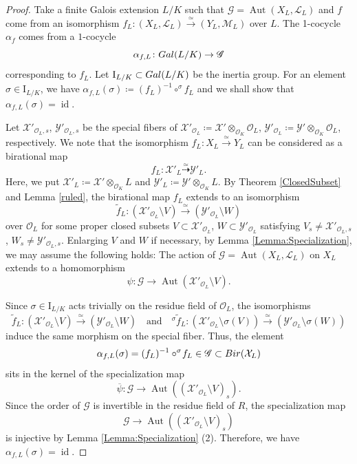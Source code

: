 \documentclass[11pt,reqno,oneside]{amsart}
\numberwithin{equation}{section}
\theoremstyle{definition}
\DeclareMathOperator{\Aut}{Aut}
\DeclareMathOperator{\id}{id}
\newcommand{\Gal}{{\rm Gal}}
\newcommand{\Bir}{{\rm Bir}}
\newcommand\rI{\mathrm{I}}
\begin{document}
\begin{proof}
Take a finite Galois extension $L/K$ such that
$\mathscr{G} = \Aut(X_{L}, \mathscr{L}_{L})$ and 
$f$ come from an isomorphism
$f_L \colon (X_L, \mathscr{L}_{L})
\overset{\simeq}{\to}
(Y_L, \mathscr{M}_{L})$ over $L$.
The 1-cocycle  $\alpha_f$ comes from a $1$-cocycle
$$\alpha_{f,L} \colon \Gal(L/K) \to \mathscr{G}$$
corresponding to $f_L$.
Let $\rI_{L/K} \subset \Gal(L/K)$ be the inertia group.
For an element $\sigma \in \rI_{L/K}$, we have
$\alpha_{f,L}(\sigma) \coloneqq (f_L)^{-1} \circ ^{\sigma} \!f_L$ 
and 
we shall show that $\alpha_{f,L}(\sigma) = \id$.

Let $\mathcal{X}'_{\mathscr{O}_L,s}$, $\mathcal{Y}'_{\mathscr{O}_L,s}$
be the special fibers of
$\mathcal{X}'_{\mathscr{O}_L} \coloneqq \mathcal{X}' \otimes_{\mathscr{O}_K} \mathscr{O}_L$,
$\mathcal{Y}'_{\mathscr{O}_L} \coloneqq \mathcal{Y}' \otimes_{\mathscr{O}_K} \mathscr{O}_L$,
respectively.
We note that the isomorphism $f_L \colon X_L \overset{\simeq}{\to} Y_L$
can be considered as a birational map
\[f_L \colon \mathcal{X}'_{L} \overset{\simeq}{\dashrightarrow} \mathcal{Y}'_{L}.\]
Here, we put $\mathcal{X}'_{L} \coloneqq \mathcal{X}' \otimes_{\mathscr{O}_K} L$ and
$\mathcal{Y}'_{L} \coloneqq \mathcal{Y}' \otimes_{\mathscr{O}_K} L$. By Theorem \ref{ClosedSubset} and Lemma \ref{ruled},
the birational map $f_L$
extends to an isomorphism
\[
  \widetilde{f}_L \colon
  (\mathcal{X}'_{\mathscr{O}_L} \setminus V) \overset{\simeq}{\to}
  (\mathcal{Y}'_{\mathscr{O}_L} \setminus W)
\]
over $\mathscr{O}_L$
for some proper closed subsets
$V \subset \mathcal{X}'_{\mathscr{O}_L}$, $W \subset \mathcal{Y}'_{\mathscr{O}_L}$
satisfying
$V_s \neq \mathcal{X}'_{\mathscr{O}_L,s}$, $W_s \neq \mathcal{Y}'_{\mathscr{O}_L,s}$.
Enlarging $V$ and $W$ if necessary, by Lemma \ref{Lemma:Specialization},
we may assume the following holds:
The action of
$\mathscr{G} = \Aut(X_{L}, \mathscr{L}_{L})$ on $X_L$
extends to a homomorphism
\[
  \psi \colon \mathscr{G} \to \Aut(\mathcal{X}'_{\mathscr{O}_L} \setminus V).
\]

Since $\sigma \in \rI_{L/K}$ acts trivially on the residue field of $\mathscr{O}_L$,
the isomorphisms
\[
  \widetilde{f}_L \colon
  (\mathcal{X}'_{\mathscr{O}_L} \setminus V) \overset{\simeq}{\to}
  (\mathcal{Y}'_{\mathscr{O}_L} \setminus W)
  \quad \text{and} \quad
  ^{\sigma} \!\widetilde{f}_L \colon
  (\mathcal{X}'_{\mathscr{O}_L} \setminus \sigma(V)) \overset{\simeq}{\to}
  (\mathcal{Y}'_{\mathscr{O}_L} \setminus \sigma(W))
\]
induce the same morphism on the special fiber.
Thus, the element
\[
 \alpha_{f,L}(\sigma) = (f_L)^{-1} \circ ^{\sigma}\!f_L \in \mathscr{G} \subset \Bir (\mathcal{X}_{L})
 \]
sits in the kernel of the specialization map
\[
  \overline{\psi} \colon \mathscr{G} \to \Aut((\mathcal{X}'_{\mathscr{O}_L} \setminus V)_s).
\]
Since the order of $\mathscr{G}$ is invertible
in the residue field of $R$,
the specialization map
$$\mathscr{G} \to \Aut((\mathcal{X}'_{\mathscr{O}_{L}} \setminus V)_{s})$$
is injective by Lemma \ref{Lemma:Specialization} (2).
Therefore,  we have $\alpha_{f,L}(\sigma) = \id$.
\end{proof}
\end{document}

